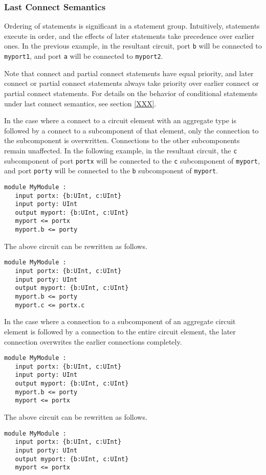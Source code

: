 \documentclass[12pt]{article}
\begin{document}
\subsubsection{Last Connect Semantics}
Ordering of statements is significant in a statement group. Intuitively, statements execute in order, and the effects of later statements take precedence over earlier ones. In the previous example, in the resultant circuit, port \verb|b| will be connected to \verb|myport1|, and port \verb|a| will be connected to \verb|myport2|. 

Note that connect and partial connect statements have equal priority, and later connect or partial connect statements always take priority over earlier connect or partial connect statements. For details on the behavior of conditional statements under last connect semantics, see section \ref{XXX}.

In the case where a connect to a circuit element with an aggregate type is followed by a connect to a subcomponent of that element, only the connection to the subcomponent is overwritten. Connections to the other subcomponents remain unaffected. In the following example, in the resultant circuit, the \verb|c| subcomponent of port \verb|portx| will be connected to the \verb|c| subcomponent of \verb|myport|, and port \verb|porty| will be connected to the \verb|b| subcomponent of \verb|myport|.
\begin{verbatim}
module MyModule :
   input portx: {b:UInt, c:UInt}
   input porty: UInt
   output myport: {b:UInt, c:UInt}
   myport <= portx
   myport.b <= porty
\end{verbatim}
The above circuit can be rewritten as follows.
\begin{verbatim}
module MyModule :
   input portx: {b:UInt, c:UInt}
   input porty: UInt
   output myport: {b:UInt, c:UInt}
   myport.b <= porty
   myport.c <= portx.c
\end{verbatim}

In the case where a connection to a subcomponent of an aggregate circuit element is followed by a connection to the entire circuit element, the later connection overwrites the earlier connections completely.

\begin{verbatim}
module MyModule :
   input portx: {b:UInt, c:UInt}
   input porty: UInt
   output myport: {b:UInt, c:UInt}
   myport.b <= porty
   myport <= portx
\end{verbatim}
The above circuit can be rewritten as follows.
\begin{verbatim}
module MyModule :
   input portx: {b:UInt, c:UInt}
   input porty: UInt
   output myport: {b:UInt, c:UInt}
   myport <= portx
\end{verbatim}
\end{document}
